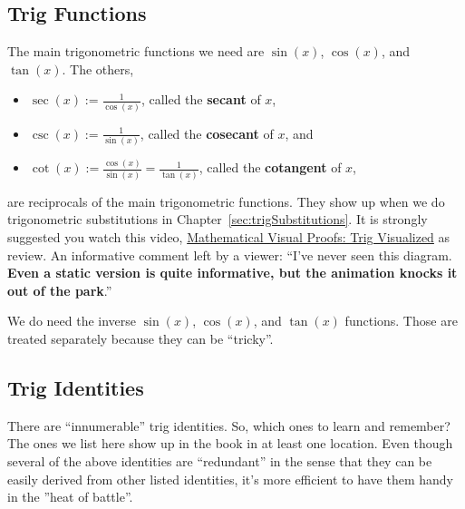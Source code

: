\subsection{Trig Functions}
The main trigonometric functions we need are $\sin(x)$, $\cos(x)$, and $\tan(x)$. 
The others,
\begin{itemize}
    \item $\sec(x):=\frac{1}{\cos(x)}$, called the \textbf{secant} of $x$,
    \item $\csc(x):=\frac{1}{\sin(x)}$, called the \textbf{cosecant} of $x$, and
    \item $\cot(x):= \frac{\cos(x)}{\sin(x)} = \frac{1}{\tan(x)}$,  called the \textbf{cotangent} of $x$,
\end{itemize}
are reciprocals of the main trigonometric functions. They show up when we do trigonometric substitutions in Chapter~\ref{sec:trigSubstitutions}. It is strongly suggested you watch this video, 
\href{https://youtu.be/dUkCgTOOpQ0}{Mathematical Visual Proofs: Trig Visualized} as review. An informative comment left by a viewer: ``I’ve never seen this diagram. \textbf{Even a static version is quite informative, but the animation knocks it out of the park}.'' 

We do need the inverse $\sin(x)$, $\cos(x)$, and $\tan(x)$ functions. Those are treated separately because they can be ``tricky''.

\subsection{Trig Identities}

There are ``innumerable'' trig identities. So, which ones to learn and remember? The ones we list here show up in the book in at least one location.
Even though several of the above identities are ``redundant'' in the sense that they can be easily derived from other listed identities, it's more efficient to have them handy in the ''heat of battle''. 


